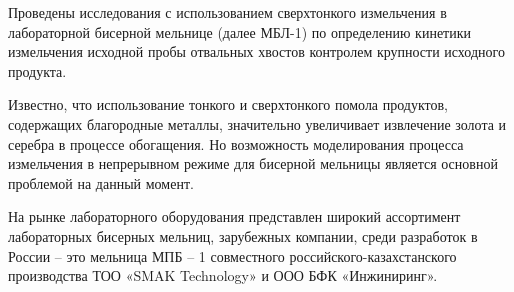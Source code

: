% 

Проведены исследования с использованием сверхтонкого измельчения в
лабораторной бисерной мельнице (далее МБЛ-1) по определению кинетики
измельчения исходной пробы отвальных хвостов контролем крупности
исходного продукта.

Известно, что использование тонкого и сверхтонкого помола продуктов,
содержащих благородные металлы, значительно увеличивает извлечение
золота и серебра в процессе обогащения. Но возможность моделирования
процесса измельчения в непрерывном режиме для бисерной мельницы является
основной проблемой на данный момент.

На рынке лабораторного оборудования представлен широкий ассортимент
лабораторных бисерных мельниц, зарубежных компании, среди разработок в
России -- это мельница МПБ -- 1 совместного российского-казахстанского
производства ТОО «SMAK Technology» и ООО БФК «Инжиниринг».

